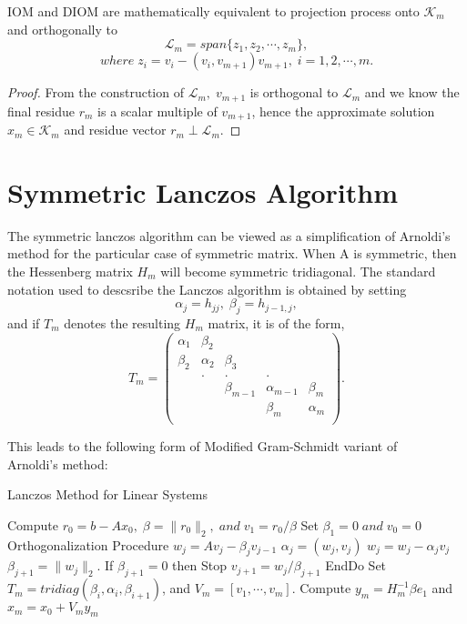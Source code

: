\documentclass[10pt,a4paper]{article}
\begin{document}
\begin{prop}
IOM and DIOM are mathematically equivalent to projection process onto $\mathcal{K}_m$ and orthogonally to
$$\mathcal{L}_m=span\{z_1,z_2,\cdots,z_m\},$$
$$where\;z_i=v_i-(v_i,v_{m+1})v_{m+1},\;i=1,2,\cdots,m.$$
\end{prop}

\begin{proof}
From the construction of $\mathcal{L}_m,\;v_{m+1}$ is orthogonal to $\mathcal{L}_m$ and we know the final residue $r_m$ is a scalar multiple of $v_{m+1}$, hence the approximate solution $x_m\in\mathcal{K}_m$ and residue vector $r_m\perp\mathcal{L}_m$.  
\end{proof}

\section{Symmetric Lanczos Algorithm}

The symmetric lanczos algorithm can be viewed as a simplification of Arnoldi's method for the particular case of symmetric matrix. When A is symmetric, then the Hessenberg matrix $H_m$ will become symmetric tridiagonal. The standard notation used to descsribe the Lanczos algorithm is obtained by setting 
$$\alpha_j=h_{jj},\;\beta_j=h_{j-1,j},$$
and if $T_m$ denotes the resulting $H_m$ matrix, it is of the form,
$$
T_m = \left( \begin{array}{ccccc}
\alpha_1 & \beta_2 &  &  &  \\
\beta_2 & \alpha_2 & \beta_3 &  &  \\
 & . & . & . &  \\
 &  & \beta_{m-1} & \alpha_{m-1} & \beta_{m} \\
 &  &  & \beta_m & \alpha_m \\
\end{array} \right). 
$$

This leads to the following form of Modified Gram-Schmidt variant of \\ Arnoldi's method:

\begin{algorithm}
\caption{Lanczos Method for Linear Systems}
\begin{algorithmic}[1]
\State Compute $r_0=b-Ax_0,\;\beta=\|r_0\|_2,\;and\;v_1=r_0/\beta$
\State Set $\beta_1=0\;and\;v_0=0$
 \Comment Orthogonalization Procedure
	\State $w_j = Av_j-\beta_jv_{j-1}$
	\State $\alpha_j=(w_j,v_j)$
	\State $w_j = w_j-\alpha_jv_j$
	\State $\beta_{j+1} = \|w_j\|_2.$ If $\beta_{j+1}=0$ then Stop
	\State $v_{j+1} = w_j/\beta_{j+1}$
\EndFor
\State EndDo
\State Set $T_m=tridiag(\beta_i,\alpha_i,\beta_{i+1})$, and $V_m=[v_1,\cdots,v_m].$
\State Compute $y_m=H^{-1}_m\beta e_1$ and $x_m=x_0+V_my_m$
\end{algorithmic}
\end{algorithm}
\end{document}
